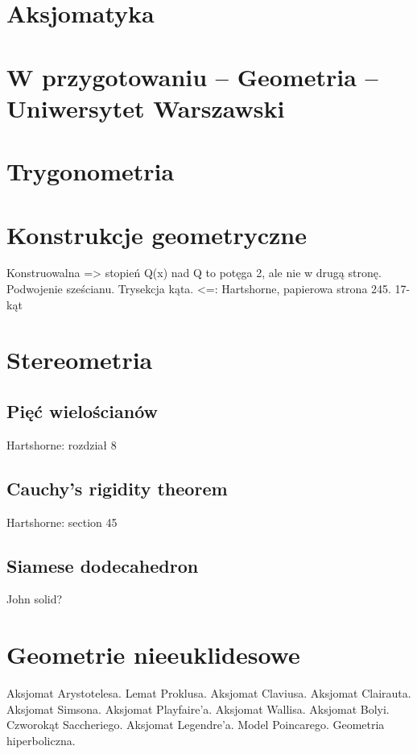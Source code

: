 \documentclass{greaseproof}
\begin{document}


\section{Aksjomatyka}


\section{W przygotowaniu -- Geometria -- Uniwersytet Warszawski}





\section{Trygonometria}


\section{Konstrukcje geometryczne}
Konstruowalna => stopień Q(x) nad Q to potęga 2, ale nie w drugą stronę.
Podwojenie sześcianu.
Trysekcja kąta.
<=: Hartshorne, papierowa strona 245.
17-kąt

\section{Stereometria}
\subsection{Pięć wielościanów}
Hartshorne: rozdział 8

\subsection{Cauchy's rigidity theorem}
Hartshorne: section 45

\subsection{Siamese dodecahedron}
John solid?


\section{Geometrie nieeuklidesowe}
Aksjomat Arystotelesa.
Lemat Proklusa.
Aksjomat Claviusa.
Aksjomat Clairauta.
Aksjomat Simsona.
Aksjomat Playfaire'a.
Aksjomat Wallisa.
Aksjomat Bolyi.
Czworokąt Saccheriego.
Aksjomat Legendre'a.
Model Poincarego.
Geometria hiperboliczna.
\end{document}
